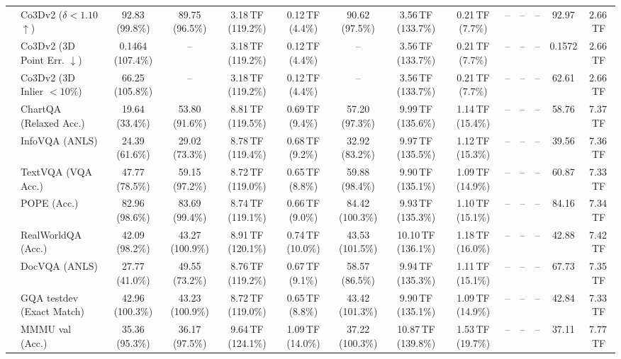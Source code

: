 \begin{table}[t]
\begin{center}
\begin{small}
\begin{sc}
{\begin{tabular}{llcccccccccccc}
& Co3Dv2 ($\delta < 1.10$ $\uparrow$) & 92.83 (99.8\%) & 89.75 (96.5\%) & 3.18\,TF (119.2\%) & 0.12\,TF (4.4\%) & 90.62 (97.5\%) & 3.56\,TF (133.7\%) & 0.21\,TF (7.7\%) & -- & -- & -- & 92.97 & 2.66\,TF \\
& Co3Dv2 (3D Point Err. $\downarrow$) & 0.1464 (107.4\%) & -- & 3.18\,TF (119.2\%) & 0.12\,TF (4.4\%) & -- & 3.56\,TF (133.7\%) & 0.21\,TF (7.7\%) & -- & -- & -- & 0.1572 & 2.66\,TF \\
& Co3Dv2 (3D Inlier $<10\%$) & 66.25 (105.8\%) & -- & 3.18\,TF (119.2\%) & 0.12\,TF (4.4\%) & -- & 3.56\,TF (133.7\%) & 0.21\,TF (7.7\%) & -- & -- & -- & 62.61 & 2.66\,TF \\
\midrule\midrule
{}
& ChartQA (Relaxed Acc.) & 19.64 (33.4\%) & 53.80 (91.6\%) & 8.81\,TF (119.5\%) & 0.69\,TF (9.4\%) & 57.20 (97.3\%) & 9.99\,TF (135.6\%) & 1.14\,TF (15.4\%) & -- & -- & -- & 58.76 & 7.37\,TF \\
& InfoVQA (ANLS) & 24.39 (61.6\%) & 29.02 (73.3\%) & 8.78\,TF (119.4\%) & 0.68\,TF (9.2\%) & 32.92 (83.2\%) & 9.97\,TF (135.5\%) & 1.12\,TF (15.3\%) & -- & -- & -- & 39.56 & 7.36\,TF \\
& TextVQA (VQA Acc.) & 47.77 (78.5\%) & 59.15 (97.2\%) & 8.72\,TF (119.0\%) & 0.65\,TF (8.8\%) & 59.88 (98.4\%) & 9.90\,TF (135.1\%) & 1.09\,TF (14.9\%) & -- & -- & -- & 60.87 & 7.33\,TF \\
& POPE (Acc.) & 82.96 (98.6\%) & 83.69 (99.4\%) & 8.74\,TF (119.1\%) & 0.66\,TF (9.0\%) & 84.42 (100.3\%) & 9.93\,TF (135.3\%) & 1.10\,TF (15.1\%) & -- & -- & -- & 84.16 & 7.34\,TF \\
& RealWorldQA (Acc.) & 42.09 (98.2\%) & 43.27 (100.9\%) & 8.91\,TF (120.1\%) & 0.74\,TF (10.0\%) & 43.53 (101.5\%) & 10.10\,TF (136.1\%) & 1.18\,TF (16.0\%) & -- & -- & -- & 42.88 & 7.42\,TF \\
& DocVQA (ANLS) & 27.77 (41.0\%) & 49.55 (73.2\%) & 8.76\,TF (119.2\%) & 0.67\,TF (9.1\%) & 58.57 (86.5\%) & 9.94\,TF (135.3\%) & 1.11\,TF (15.1\%) & -- & -- & -- & 67.73 & 7.35\,TF \\
& GQA testdev (Exact Match) & 42.96 (100.3\%) & 43.23 (100.9\%) & 8.72\,TF (119.0\%) & 0.65\,TF (8.8\%) & 43.42 (101.3\%) & 9.90\,TF (135.1\%) & 1.09\,TF (14.9\%) & -- & -- & -- & 42.84 & 7.33\,TF \\
& MMMU val (Acc.) & 35.36 (95.3\%) & 36.17 (97.5\%) & 9.64\,TF (124.1\%) & 1.09\,TF (14.0\%) & 37.22 (100.3\%) & 10.87\,TF (139.8\%) & 1.53\,TF (19.7\%) & -- & -- & -- & 37.11 & 7.77\,TF \\

\end{tabular}}
\end{sc}
\end{small}
\end{center}
\end{table}
